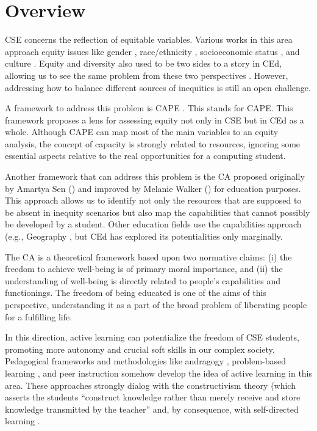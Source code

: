 \section{Overview}
\label{intro-sec:overview}

\gls{CSE} concerns the reflection of equitable variables. Various works in this area approach equity issues like gender \cite{kim:2011}, race/ethnicity \cite{nakajima:2024}, socioeconomic status \cite{parker:2018}, and culture \cite{arawjo:2021}. Equity and diversity also used to be two sides to a story in \acrfull{CEd}, allowing us to see the same problem from these two perspectives \cite{lewis:2019}. However, addressing how to balance different sources of inequities is still an open challenge.

A framework to address this problem is CAPE \cite{fletcher:2021}. This stands for \acrfull{CAPE}. This framework proposes a lens for assessing equity not only in \gls{CSE} but in \gls{CEd} as a whole. Although \gls{CAPE} can map most of the main variables to an equity analysis, the concept of capacity is strongly related to resources, ignoring some essential aspects relative to the real opportunities for a computing student.

Another framework that can address this problem is the \acrfull{CA} proposed originally by Amartya Sen (\citeyear{sen:1992}) and improved by Melanie Walker (\citeyear{walker:2006}) for education purposes. This approach allows us to identify not only the resources that are supposed to be absent in inequity scenarios but also map the capabilities that cannot possibly be developed by a student. Other education fields use the capabilities approach (e.g., Geography \cite{walkington:2018}, but \gls{CEd} has explored its potentialities only marginally.

The \gls{CA} is a theoretical framework based upon two normative claims: (i) the freedom to achieve well-being is of primary moral importance, and (ii) the understanding of well-being is directly related to people’s capabilities and functionings. The freedom of being educated is one of the aims of this perspective, understanding it as a part of the broad problem of liberating people for a fulfilling life.

In this direction, active learning can potentialize the freedom of \gls{CSE} students, promoting more autonomy and crucial soft skills in our complex society. Pedagogical frameworks and methodologies like andragogy \cite{ellis:2002}, problem-based learning \cite{santos:2021}, and peer instruction \cite{bispojr:2021} somehow develop the idea of active learning in this area. These approaches strongly dialog with the constructivism theory (which asserts the students “construct knowledge rather than merely receive and store knowledge transmitted by the teacher” \cite[p.~45]{ben-ari:2001} and, by consequence, with self-directed learning \cite{mccartney:2016}. 

